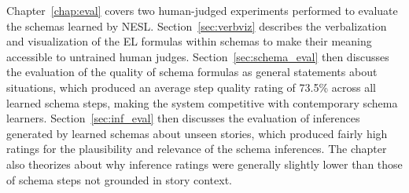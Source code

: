 Chapter~\ref{chap:eval} covers two human-judged experiments performed to evaluate the schemas learned by NESL. Section~\ref{sec:verbviz} describes the verbalization and visualization of the EL formulas within schemas to make their meaning accessible to untrained human judges. Section~\ref{sec:schema_eval} then discusses the evaluation of the quality of schema formulas as general statements about situations, which produced an average step quality rating of 73.5\% across all learned schema steps, making the system competitive with contemporary schema learners. Section~\ref{sec:inf_eval} then discusses the evaluation of inferences generated by learned schemas about unseen stories, which produced fairly high ratings for the plausibility and relevance of the schema inferences. The chapter also theorizes about why inference ratings were generally slightly lower than those of schema steps not grounded in story context.